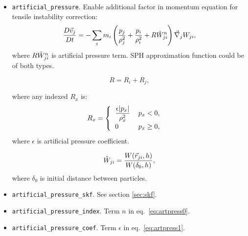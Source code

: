 \begin{itemize}
    \item \verb|artificial_pressure|. Enable additional factor in momentum equation for tensile instability correction:
    \begin{equation}\label{eq:artpress0}
        \frac{D\vec{v}_j}{D t} = 
        -\sum\limits_{i} m_{i} 
        \left(
        \frac{p_{j}}{\rho_{j}^{2}} + 
        \frac{p_{i}}{\rho_{i}^{2}} +
        R\Tilde{W}_{ji}^{n}
        \right) \vec{\nabla}_{j} W_{ji},
    \end{equation}
    where $R\Tilde{W}_{ji}^{n}$ is artificial pressure term. SPH approximation function could be of both types.
    
    \begin{equation}
        R = R_{i} + R_{j},
    \end{equation}

    where any indexed $R_{x}$ is:
    \begin{equation}\label{eq:artpress1}
        R_{x} = 
        \begin{cases}
          \begin{tabular}{l l}
              $\displaystyle{
              \frac{\epsilon|p_{x}|}{\rho_{x}^{2}}
              }$
              &
              $p_{x} < 0$, 
              
              \\
              
              0
              &
              $p_{x} \geq 0$,
          \end{tabular}  
        \end{cases} 
    \end{equation}
    where $\epsilon$ is artificial pressure coefficient.
    
    \begin{equation}
        \Tilde{W}_{ji} = \frac{W(\vec{r}_{ji}, h)}{W(\delta_{0}, h)},
    \end{equation}
    where $\delta_{0}$ is initial distance between particles.

    \item \verb|artificial_pressure_skf|. See section \ref{sec:skf}.
    \item \verb|artificial_pressure_index|. Term $n$ in eq.~\ref{eq:artpress0}.
    \item \verb|artificial_pressure_coef|. Term $\epsilon$ in eq.~\ref{eq:artpress1}.
\end{itemize}

